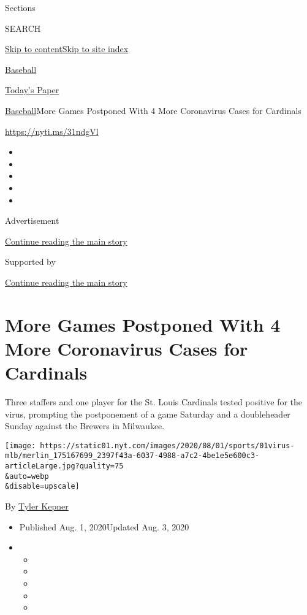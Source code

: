 Sections

SEARCH

\protect\hyperlink{site-content}{Skip to
content}\protect\hyperlink{site-index}{Skip to site index}

\href{https://www.nytimes.com/section/sports/baseball}{Baseball}

\href{https://myaccount.nytimes.com/auth/login?response_type=cookie\&client_id=vi}{}

\href{https://www.nytimes.com/section/todayspaper}{Today's Paper}

\href{/section/sports/baseball}{Baseball}\textbar{}More Games Postponed
With 4 More Coronavirus Cases for Cardinals

\url{https://nyti.ms/31ndgVl}

\begin{itemize}
\item
\item
\item
\item
\item
\end{itemize}

Advertisement

\protect\hyperlink{after-top}{Continue reading the main story}

Supported by

\protect\hyperlink{after-sponsor}{Continue reading the main story}

\hypertarget{more-games-postponed-with-4-more-coronavirus-cases-for-cardinals}{%
\section{More Games Postponed With 4 More Coronavirus Cases for
Cardinals}\label{more-games-postponed-with-4-more-coronavirus-cases-for-cardinals}}

Three staffers and one player for the St. Louis Cardinals tested
positive for the virus, prompting the postponement of a game Saturday
and a doubleheader Sunday against the Brewers in Milwaukee.

\texttt{[image: https://static01.nyt.com/images/2020/08/01/sports/01virus-mlb/merlin\_175167699\_2397f43a-6037-4988-a7c2-4be1e5e600c3-articleLarge.jpg?quality=75\\\&auto=webp\\\&disable=upscale]}

By \href{https://www.nytimes.com/by/tyler-kepner}{Tyler Kepner}

\begin{itemize}
\item
  Published Aug. 1, 2020Updated Aug. 3, 2020
\item
  \begin{itemize}
  \item
  \item
  \item
  \item
  \item
  \end{itemize}
\end{itemize}

